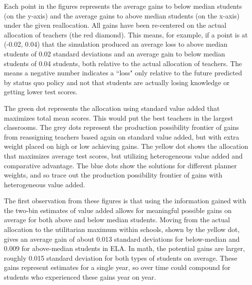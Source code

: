 \documentclass[12pt]{article}
\theoremstyle{definition}
\theoremstyle{definition}
\theoremstyle{definition}
\theoremstyle{definition}
\begin{document}
	Each point in the figures represents the average gains to below median students (on the y-axis) and the average gains to above median students (on the x-axis) under the given reallocation. All gains have been re-centered on the actual allocation of teachers (the red diamond). This means, for example, if a point is at (-0.02, 0.04) that the simulation produced an average loss to above median students of 0.02 standard deviations and an average gain to below median students of 0.04 students, both relative to the actual allocation of teachers. The means a negative number indicates a ``loss" only relative to the future predicted by status quo policy and not that students are actually losing knowledge or getting lower test scores. 

 The green dot represents the allocation using standard value added that maximizes total mean scores. This would put the best teachers in the largest classrooms. The grey dots represent the production possibility frontier of gains from reassigning teachers based again on standard value added, but with extra weight placed on high or low achieving gains. The yellow dot shows the allocation that maximizes average test scores, but utilizing heterogeneous value added and comparative advantage. The blue dots show the solutions for different planner weights, and so trace out the production possibility frontier of gains with heterogeneous value added. 


	The first observation from these figures is that using the information gained with the two-bin estimates of value added allows for meaningful possible gains on average for both above and below median students. Moving from the actual allocation to the utilitarian maximum within schools, shown by the yellow dot, gives an average gain of about 0.013 standard deviations for below-median and 0.009 for above-median students in ELA.  In math, the potential gains are larger, roughly 0.015 standard deviation for both types of students on average. These gains represent estimates for a single year, so over time could compound for students who experienced these gains year on year. 
\end{document}
